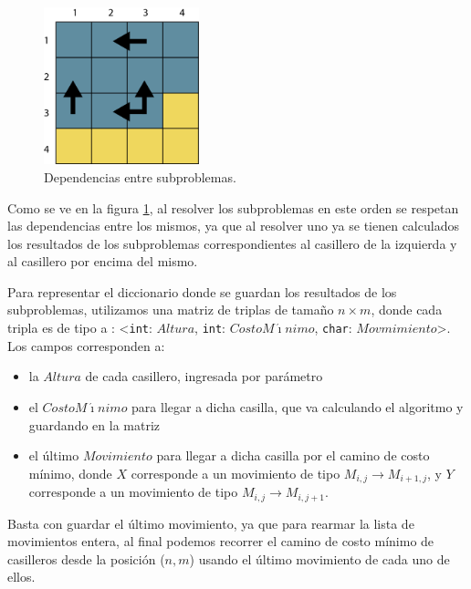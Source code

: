 \begin{figure}[H]
 \centering
	\includegraphics[width=0.4\textwidth]{img/3-3.png}
	\caption{\footnotesize Dependencias entre subproblemas.}
	\label{fig:3-3}
\end{figure}

Como se ve en la figura \ref{fig:3-3}, al resolver los subproblemas en este orden 
se respetan las dependencias entre los mismos, ya que al resolver uno ya se tienen calculados los resultados de los subproblemas correspondientes al casillero de la izquierda y al casillero por encima del mismo.

Para representar el diccionario donde se guardan los resultados de los subproblemas, utilizamos una matriz de triplas de tamaño $n \times m$, donde cada tripla es de tipo a : <\texttt{int}: $Altura$, \texttt{int}: $CostoM\acute{\imath}nimo$, \texttt{char}: $Movmimiento$>. Los campos corresponden a:
\begin{itemize}
\item la $Altura$ de cada casillero, ingresada por parámetro
\item el $CostoM\acute{\imath}nimo$ para llegar a dicha casilla, que va calculando el algoritmo y guardando en la matriz
\item el último $Movimiento$ para llegar a dicha casilla por el camino de costo mínimo, donde $X$ corresponde a un movimiento de tipo $M_{i,j} \rightarrow M_{i+1,j}$, y $Y$ corresponde a un movimiento de tipo $M_{i,j} \rightarrow M_{i,j+1}$.
\end{itemize}
Basta con guardar el último movimiento, ya que para rearmar la lista de movimientos entera, al final podemos recorrer el camino de costo mínimo de casilleros desde la posición ($n,m$) usando el último movimiento de cada uno de ellos.

